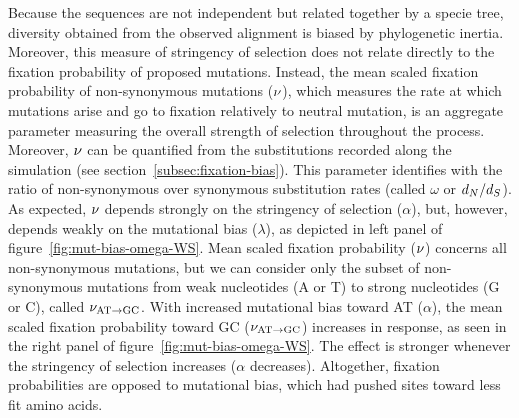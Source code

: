
Because the sequences are not independent but related together by a specie tree, diversity obtained from the observed alignment is biased by phylogenetic inertia.
Moreover, this measure of stringency of selection does not relate directly to the fixation probability of proposed mutations.
Instead, the mean scaled fixation probability of non-synonymous mutations ($\nu$), which measures the rate at which mutations arise and go to fixation relatively to neutral mutation, is an aggregate parameter measuring the overall strength of selection throughout the process.
Moreover, $\nu$ can be quantified from the substitutions recorded along the simulation (see section~\ref{subsec:fixation-bias}).
This parameter identifies with the ratio of non-synonymous over synonymous substitution rates (called $\omega$ or $d_N / d_S$).
As expected, $\nu$ depends strongly on the stringency of selection ($\alpha$), but, however, depends weakly on the mutational bias ($\lambda$), as depicted in left panel of figure~\ref{fig:mut-bias-omega-WS}.
Mean scaled fixation probability ($\nu$) concerns all non-synonymous mutations, but we can consider only the subset of non-synonymous mutations from weak nucleotides (A or T) to strong nucleotides (G or C), called $\nu_{\text{AT} \rightarrow \text{GC}}$.
With increased mutational bias toward AT ($\alpha$), the mean scaled fixation probability toward GC ($\nu_{\text{AT} \rightarrow \text{GC}}$) increases in response, as seen in the right panel of figure~\ref{fig:mut-bias-omega-WS}.
The effect is stronger whenever the stringency of selection increases ($\alpha$ decreases).
Altogether, fixation probabilities are opposed to mutational bias, which had pushed sites toward less fit amino acids.

